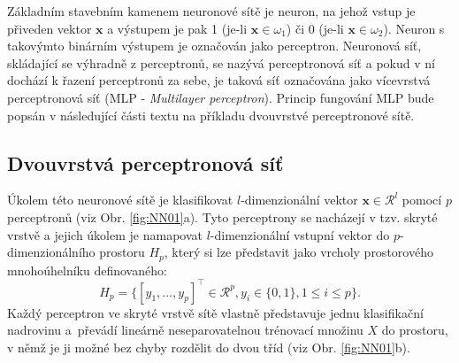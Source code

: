 {\par{Základním stavebním kamenem neuronové sítě je neuron, na jehož vstup je přiveden vektor $\bm{x}$ a výstupem je pak 1 (je-li $\bm{x}\in\omega_1$)  či 0 (je-li $\bm{x}\in\omega_2$). Neuron s takovýmto binárním výstupem je označován jako perceptron. Neuronová síť, skládající se výhradně z perceptronů, se nazývá perceptronová síť a pokud v ní dochází k řazení perceptronů za sebe, je taková síť označována jako vícevrstvá perceptronová síť (MLP - \textit{Multilayer perceptron}). Princip fungování MLP bude popsán v následující části textu na příkladu dvouvrstvé perceptronové sítě.}

\subsection*{Dvouvrstvá perceptronová síť}
\par{Úkolem této neuronové sítě je klasifikovat $l$-dimenzionální vektor $\bm{x}\in\mathcal{R}^l$ pomocí $p$ perceptronů (viz Obr. \ref{fig:NN01}a). Tyto perceptrony se nacházejí v tzv. skryté vrstvě a jejich úkolem je namapovat $l$-dimenzionální vstupní vektor do $p$-dimenzionálního prostoru $H_p$, který si lze představit jako vrcholy prostorového mnohoúhelníku definovaného:
\begin{displaymath}
	H_p=\{\left[y_1,\ldots,y_p\right]^\top\in\mathcal{R}^p,y_i\in\{0,1\},1\leq i \leq p \}.
\end{displaymath}
Každý perceptron ve skryté vrstvě sítě vlastně představuje jednu klasifikační nadrovinu
a~převádí lineárně neseparovatelnou trénovací množinu $X$ do prostoru, v němž je ji možné bez chyby rozdělit do dvou tříd (viz Obr. \ref{fig:NN01}b).







\newpage











}}
